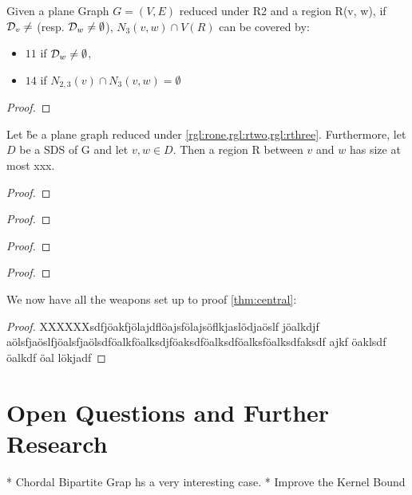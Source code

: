 \begin{lemma}
   Given a plane Graph $G = (V,E)$ reduced under R2 and a region R(v, w), if $\mathcal{D}_{v} \neq $ (resp. $\mathcal{D}_{w} \neq \emptyset$), $N_3(v,w) \cap V(R)$ can be covered by: 
   \begin{itemize}
    \item $11$ \sr if $\mathcal{D}_{w} \neq \emptyset$, 
    \item $14$ \sr if $N_{2,3}(v) \cap N_3(v,w) = \emptyset$
   \end{itemize}
\end{lemma}

\begin{proof} 
\end{proof}

\begin{lemma}
    Let \G be a plane graph reduced under \cref{rgl:rone,rgl:rtwo,rgl:rthree}. Furthermore, let $D$ be a SDS of G and let $v,w \in D$. Then a region R between $v$ and $w$ has size at most xxx.
\end{lemma}
\begin{proof} 
\end{proof}

\begin{lemma}
    
\end{lemma}
\begin{proof} 
\end{proof}

\begin{lemma}
    
\end{lemma}
\begin{proof} 
\end{proof}


\begin{lemma}
    
\end{lemma}
\begin{proof} 
\end{proof}

We now have all the weapons set up to proof \cref{thm:central}: 

\centraltheo*
\begin{proof}
    XXXXXXsdfjöakfjölajdflöajsfölajsöflkjaslödjaöslf jöalkdjf aölsfjaöslfjöalsfjaölsdföalkföalksdjföaksdföalksdföalksföalksdfaksdf ajkf öaklsdf öalkdf öal    lökjadf
\end{proof}

\chapter{Open Questions and Further Research}

* Chordal Bipartite Grap hs a very interesting case.
* Improve the Kernel Bound